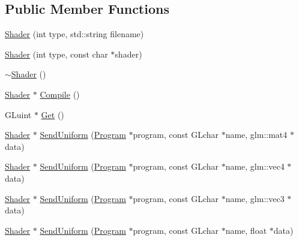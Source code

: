 \subsection*{Public Member Functions}
\begin{DoxyCompactItemize}
\item 
\mbox{\hyperlink{classEngine_1_1Components_1_1Graphics_1_1Shader_a4935f2ee3ebdd8af6fc78cf42f63d915}{Shader}} (int type, std\+::string filename)
\item 
\mbox{\hyperlink{classEngine_1_1Components_1_1Graphics_1_1Shader_af0014ee53239fa71cddfae086d0a1781}{Shader}} (int type, const char $\ast$shader)
\item 
\mbox{\hyperlink{classEngine_1_1Components_1_1Graphics_1_1Shader_a9a82a7a62443e928d9d95e3a0e4f1407}{$\sim$\+Shader}} ()
\item 
\mbox{\hyperlink{classEngine_1_1Components_1_1Graphics_1_1Shader}{Shader}} $\ast$ \mbox{\hyperlink{classEngine_1_1Components_1_1Graphics_1_1Shader_a348854b43d99bfe43e3d2b0cad5f103d}{Compile}} ()
\item 
G\+Luint $\ast$ \mbox{\hyperlink{classEngine_1_1Components_1_1Graphics_1_1Shader_ad7c094ce0d42b3399e3533b3652a33fe}{Get}} ()
\item 
\mbox{\hyperlink{classEngine_1_1Components_1_1Graphics_1_1Shader}{Shader}} $\ast$ \mbox{\hyperlink{classEngine_1_1Components_1_1Graphics_1_1Shader_a24131f3622fe536794de21e0fb499276}{Send\+Uniform}} (\mbox{\hyperlink{classEngine_1_1Components_1_1Graphics_1_1Program}{Program}} $\ast$program, const G\+Lchar $\ast$name, glm\+::mat4 $\ast$data)
\item 
\mbox{\hyperlink{classEngine_1_1Components_1_1Graphics_1_1Shader}{Shader}} $\ast$ \mbox{\hyperlink{classEngine_1_1Components_1_1Graphics_1_1Shader_a39cbcddb61ef315da0d24a11a650f09a}{Send\+Uniform}} (\mbox{\hyperlink{classEngine_1_1Components_1_1Graphics_1_1Program}{Program}} $\ast$program, const G\+Lchar $\ast$name, glm\+::vec4 $\ast$data)
\item 
\mbox{\hyperlink{classEngine_1_1Components_1_1Graphics_1_1Shader}{Shader}} $\ast$ \mbox{\hyperlink{classEngine_1_1Components_1_1Graphics_1_1Shader_a650108330666f299b13b8336140bca92}{Send\+Uniform}} (\mbox{\hyperlink{classEngine_1_1Components_1_1Graphics_1_1Program}{Program}} $\ast$program, const G\+Lchar $\ast$name, glm\+::vec3 $\ast$data)
\item 
\mbox{\hyperlink{classEngine_1_1Components_1_1Graphics_1_1Shader}{Shader}} $\ast$ \mbox{\hyperlink{classEngine_1_1Components_1_1Graphics_1_1Shader_a12769923328fcb0f970458cf3feed273}{Send\+Uniform}} (\mbox{\hyperlink{classEngine_1_1Components_1_1Graphics_1_1Program}{Program}} $\ast$program, const G\+Lchar $\ast$name, float $\ast$data)

\end{DoxyCompactItemize}
